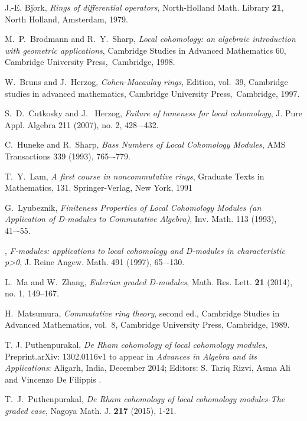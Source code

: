 \documentclass{amsart}
\theoremstyle{plain}
\theoremstyle{definition}
\theoremstyle{remark}
\begin{document}
\begin{thebibliography}{10}

 J.-E. Bj$\ddot{o}$rk, \emph{Rings of differential operators}, North-Holland Math. Library \textbf{21}, North Holland, Amsterdam, 1979. 

M.~P.~Brodmann and R.~Y.~Sharp, 
\emph{Local cohomology: an algebraic introduction with geometric applications}, Cambridge Studies in Advanced Mathematics 60, Cambridge University Press,~Cambridge, 1998.

W.~Bruns and J.~Herzog, \emph{{Cohen-Macaulay rings}}, 
 Edition, vol.~39, Cambridge
  studies in advanced mathematics, Cambridge University Press,~Cambridge, 1997.

S.~D.~Cutkosky and J.~ Herzog, 
\emph{Failure of tameness for local cohomology},
J. Pure Appl. Algebra 211 (2007), no. 2, 428–-432. 

C.~Huneke and R.~Sharp,
\emph{ Bass Numbers of Local Cohomology Modules}, 
AMS Transactions 339 (1993), 765–-779. 

T.~Y.~Lam,
\emph{A first course in noncommutative rings},
Graduate Texts in Mathematics, 131. Springer-Verlag, New York, 1991


G.~Lyubeznik, 
\emph{Finiteness Properties of Local Cohomology Modules (an Application of D-modules to Commutative Algebra)},
 Inv. Math. 113 (1993), 41–-55.
 
\bysame,
\emph{F-modules: applications to local cohomology and D-modules in characteristic p>0}, 
J. Reine Angew. Math. 491 (1997), 65–-130.

 
  L.~Ma and W.~Zhang, \emph{Eulerian graded D-modules}, Math. Res. Lett. \textbf{21} (2014), no. 1, 149–167.
 
H.~Matsumura, \emph{Commutative ring theory}, second ed., Cambridge
  Studies in Advanced Mathematics, vol.~8, Cambridge University Press,
  Cambridge, 1989. 

 
   T. J. Puthenpurakal, \emph{De Rham cohomology of local cohomology modules}, Preprint.arXiv:
1302.0116v1 to appear in \textit{Advances in Algebra and its Applications}: Aligarh, India, December 2014; Editors: S. Tariq Rizvi, Asma Ali and Vincenzo De Filippis .

 
  T.~J.~Puthenpurakal, \emph{De Rham cohomology of local cohomology modules-The graded case}, Nagoya Math. J. \textbf{217} (2015), 1-21.
 

\end{thebibliography}
\end{document}
